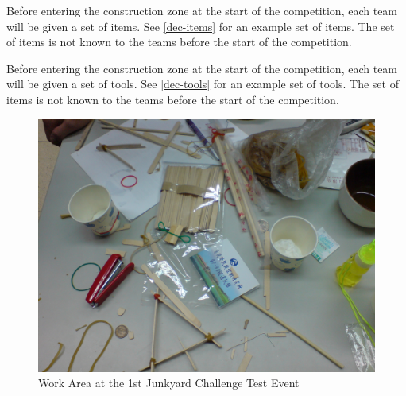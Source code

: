 \documentclass[12pt]{hurocup}
\begin{document}
\label{law-iteams-and-tools}

\begin{lawlist}[JC]

\item \label{l-items} Before entering the construction zone at the
  start of the competition, each team will be given a set of
  items. See \ref{dec-items} for an example set of items. The set of
  items is not known to the teams before the start of the competition.

\item \label{l-tools} Before entering the construction zone at the
  start of the competition, each team will be given a set of
  tools. See \ref{dec-tools} for an example set of tools. The set of
  items is not known to the teams before the start of the competition.

\end{lawlist}

\begin{figure}
\begin{center}
\includegraphics[width=0.8\linewidth]{Figures/junkyard_challenge_table}
\caption{Work Area at the 1st Junkyard Challenge Test Event}
\label{fig:work-area}
\end{center}
\end{figure}
\end{document}

